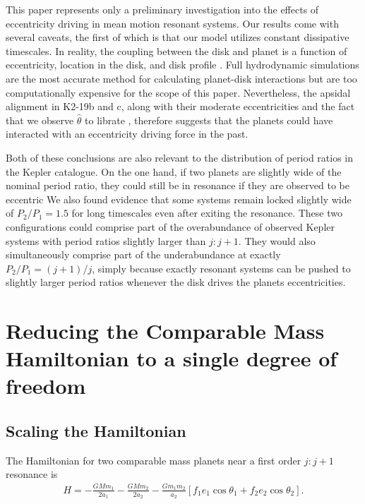 \documentclass[usenatbib,twocolumn]{mnras}
\begin{document}
This paper represents only a preliminary investigation into the
effects of eccentricity driving in mean motion resonant systems. Our
results come with several caveats, the first of which is that our
model utilizes constant dissipative timescales. In reality, the
coupling between the disk and planet is a function of eccentricity,
location in the disk, and disk profile
\citep{cresswell_evolution_2006,cresswell_three-dimensional_2008}.  Full
hydrodynamic simulations are the most accurate method for calculating
planet-disk interactions but are too computationally expensive for the
scope of this paper.  Nevertheless, the apsidal alignment in K2-19b
and c, along with their moderate eccentricities and the fact that we
observe \(\hat\theta\) to librate \citep{petit_resonance_2020}, therefore
suggests that the planets could have interacted with an eccentricity
driving force in the past.

Both of these conclusions are also relevant to the distribution of
period ratios in the Kepler catalogue.  On the one hand, if two
planets are slightly wide of the nominal period ratio, they could
still be in resonance if they are observed to be eccentric \citep[e.g., ][]{petit_resonance_2020}  We also
found evidence that some systems remain locked slightly wide of
\(P_2/P_1=1.5\) for long timescales even after exiting the resonance.
These two configurations could comprise part of the overabundance of
observed Kepler systems with period ratios slightly larger than
\(j:j+1\). They would also simultaneously comprise part of the
underabundance at exactly \(P_2/P_1 = (j+1)/j\), simply because exactly
resonant systems can be pushed to slightly larger period ratios
whenever the disk drives the planets eccentricities.


\clearpage
\onecolumn
\appendix
\section{Reducing the Comparable Mass Hamiltonian to a single degree of freedom}
\label{sec:orgcffacf2}
\subsection{Scaling the Hamiltonian}
\label{sec:orgc8d4f5c}
The Hamiltonian for two comparable mass planets near a first order \(j:j+1\)
resonance is
\begin{align}
  H = -\frac{G M m_{1}}{2 a_{1}}-\frac{G M m_{2}}{2 a_{2}}
                 -\frac{G m_{1} m_{2}}{a_{2}}
                  \left[
                  f_{1} e_{1} \cos \theta_{1} 
                  +f_{2} e_{2} \cos \theta_{2}\right].
\end{align}
\end{document}
